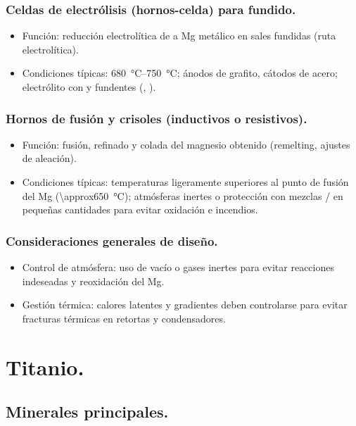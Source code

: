 \documentclass[12pt,a4paper]{article}
\begin{document}
\subsubsection{Celdas de electrólisis (hornos-celda) para  fundido.}

\begin{itemize}
  \item Función: reducción electrolítica de  a Mg metálico en sales fundidas (ruta electrolítica).
  \item Condiciones típicas: \SIrange[range-phrase = { - }, range-units=single]{680}{750}{\celsius}; ánodos de grafito, cátodos de acero; electrólito con  y fundentes (, ).
\end{itemize}

\subsubsection{Hornos de fusión y crisoles (inductivos o resistivos).}

\begin{itemize}
  \item Función: fusión, refinado y colada del magnesio obtenido (remelting, ajustes de aleación).
  \item Condiciones típicas: temperaturas ligeramente superiores al punto de fusión del Mg (\SI{\approx650}{\celsius}); atmósferas inertes o protección con mezclas / en pequeñas cantidades para evitar oxidación e incendios.
\end{itemize}

\subsubsection{Consideraciones generales de diseño.}
\begin{itemize}
  \item Control de atmósfera: uso de vacío o gases inertes para evitar reacciones indeseadas y reoxidación del Mg.
  \item Gestión térmica: calores latentes y gradientes deben controlarse para evitar fracturas térmicas en retortas y condensadores.
\end{itemize}

\section{Titanio.}

\subsection{Minerales principales.}
\end{document}
